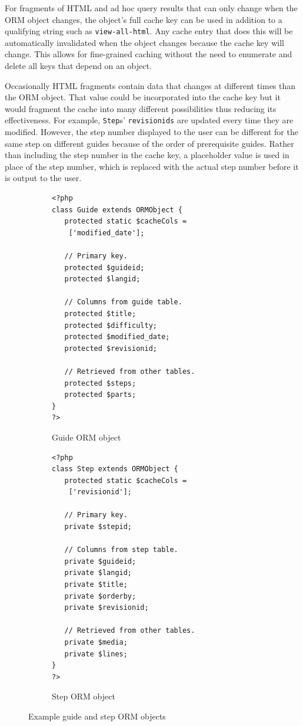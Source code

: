 \documentclass[12pt]{ucthesis}
\begin{document}
For fragments of HTML and ad hoc query results that can only change when the ORM object changes, the object's full cache key can be used in addition to a qualifying string such as {\tt view-all-html}.
Any cache entry that does this will be automatically invalidated when the object changes because the cache key will change.
This allows for fine-grained caching without the need to enumerate and delete all keys that depend on an object.

Occasionally HTML fragments contain data that changes at different times than the ORM object.
That value could be incorporated into the cache key but it would fragment the cache into many different possibilities thus reducing its effectiveness.
For example, {\tt Step}s' {\tt revisionids} are updated every time they are modified.
However, the step number displayed to the user can be different for the same step on different guides because of the order of prerequisite guides.
Rather than including the step number in the cache key, a placeholder value is used in place of the step number, which is replaced with the actual step number before it is output to the user.

\begin{figure}[h]
\begin{subfigure}[h]{0.5\textwidth}
\begin{ssp}
\begin{verbatim}
<?php
class Guide extends ORMObject {
   protected static $cacheCols =
    ['modified_date'];

   // Primary key.
   protected $guideid;
   protected $langid;

   // Columns from guide table.
   protected $title;
   protected $difficulty;
   protected $modified_date;
   protected $revisionid;

   // Retrieved from other tables.
   protected $steps;
   protected $parts;
}
?>
\end{verbatim}
\end{ssp}
\caption{Guide ORM object}
\label{fig:guideORMTable}
\end{subfigure}
\begin{subfigure}[h]{0.5\textwidth}
\begin{ssp}
\begin{verbatim}
<?php
class Step extends ORMObject {
   protected static $cacheCols =
    ['revisionid'];

   // Primary key.
   private $stepid;

   // Columns from step table.
   private $guideid;
   private $langid;
   private $title;
   private $orderby;
   private $revisionid;

   // Retrieved from other tables.
   private $media;
   private $lines;
}
?>
\end{verbatim}
\end{ssp}
\caption{Step ORM object}
\label{fig:stepORMObject}
\end{subfigure}
\caption{Example guide and step ORM objects}
\label{fig:cachingExample}
\end{figure}
\end{document}
